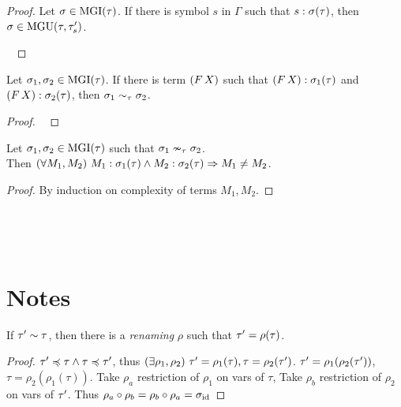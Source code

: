 \documentclass[a4paper,oneside]{memoir}
\begin{document}
\begin{proof}
Let $\sigma \in \operatorname{MGI}(\tau)$.
If there is symbol $s$ in $\Gamma$ such that
$s : \sigma(\tau) $, then $\sigma \in \operatorname{MGU}(\tau,\tau^\prime_s)$.  

~

\end{proof}


\begin{lemma}
Let $\sigma_1, \sigma_2 \in \operatorname{MGI}(\tau)$.
If there is term $(F\,X)$ such that
$(F\,X) : \sigma_1(\tau) $ and $(F\,X) : \sigma_2(\tau)$, then
$\sigma_1 \sim_\tau \sigma_2$.  
\end{lemma}
\begin{proof}~


\end{proof}


\begin{conjecture}
Let $\sigma_1, \sigma_2 \in \operatorname{MGI}(\tau)$ such that $\sigma_1 \nsim_\tau \sigma_2$. \\
Then $(\forall M_1,M_2)\  M_1 : \sigma_1(\tau) \wedge M_2 : \sigma_2(\tau) \Rightarrow M_1 \neq M_2$.  
\end{conjecture}
\begin{proof}
By induction on complexity of terms $M_1,M_2$.

\end{proof}



~

~

\section{Notes}

\begin{lemma}
\label{lem:ren1}
If $\tau^\prime \sim \tau$, then there is a \textit{renaming} $\rho$ such that $\tau^\prime = \rho(\tau)$.
\end{lemma}
\begin{proof}
$\tau^\prime \preccurlyeq \tau \wedge \tau \preccurlyeq \tau^\prime$, thus $(\exists \rho_1, \rho_2)\ \tau^\prime = \rho_1(\tau), \tau = \rho_2(\tau^\prime)$.
$\tau^\prime = \rho_1(\rho_2(\tau^\prime))$, $\tau = \rho_2(\rho_1(\tau))$.
Take $\rho_a$ restriction of $\rho_1$ on vars of $\tau$,
Take $\rho_b$ restriction of $\rho_2$ on vars of $\tau^\prime$.
Thus $\rho_a \circ \rho_b = \rho_b \circ \rho_a = \sigma_{\operatorname{id}}$ 
\end{proof}
\end{document}
